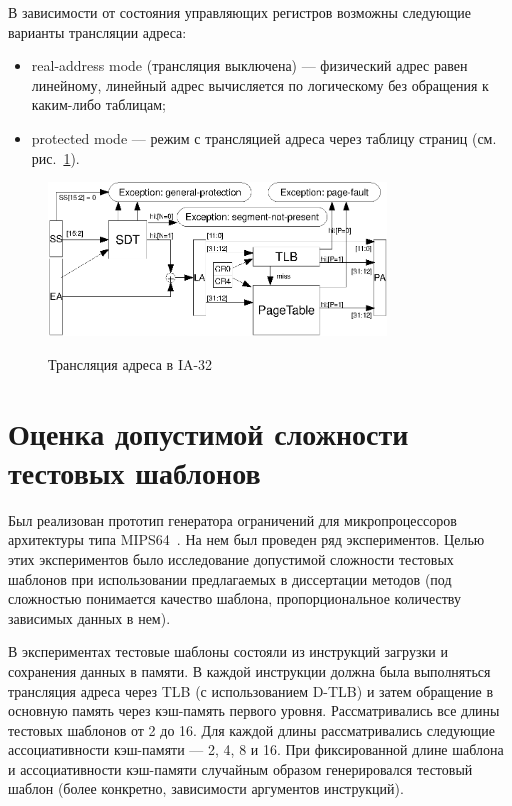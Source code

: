 В зависимости от состояния управляющих регистров возможны следующие варианты трансляции адреса:
\begin{itemize}
  \item real-address mode (трансляция выключена) --- физический адрес равен линейному, линейный адрес вычисляется по логическому без обращения к каким-либо таблицам;
  \item protected mode --- режим с трансляцией адреса через таблицу страниц (см. рис.~\ref{fig:ia32_address_translation}).
\end{itemize}

\begin{figure}[h] \center
  \includegraphics[width=0.8\textwidth]{4.analysis/ia32_addrtrans}\\
  \caption{Трансляция адреса в IA-32}\label{fig:ia32_address_translation}
\end{figure}

\section{Оценка допустимой сложности тестовых шаблонов}\label{sec:templates_estimation}


Был реализован прототип генератора ограничений для микропроцессоров архитектуры
типа MIPS64~\cite{mips64II}. На нем был проведен ряд экспериментов. Целью этих
экспериментов было исследование допустимой сложности тестовых шаблонов при
использовании предлагаемых в диссертации методов (под сложностью понимается
качество шаблона, пропорциональное количеству зависимых данных в нем).

В экспериментах тестовые шаблоны состояли из инструкций загрузки и сохранения
данных в памяти. В каждой инструкции должна была выполняться трансляция адреса
через TLB (с использованием D-TLB) и затем обращение в основную память через
кэш-память первого уровня. Рассматривались все длины тестовых шаблонов от 2 до
16. Для каждой длины рассматривались следующие ассоциативности кэш-памяти --- 2,
4, 8 и 16. При фиксированной длине шаблона и ассоциативности кэш-памяти
случайным образом генерировался тестовый шаблон (более конкретно, зависимости
аргументов инструкций).

